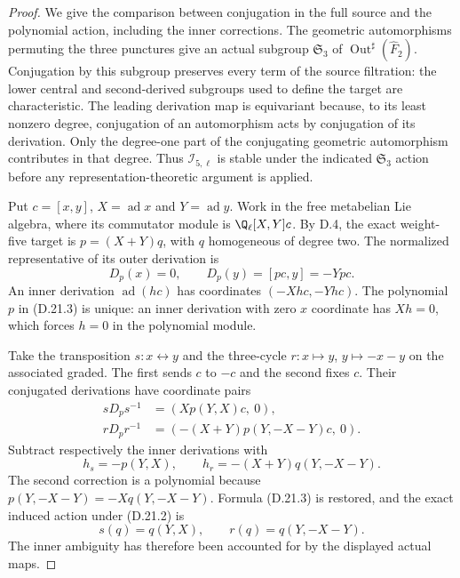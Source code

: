\begin{proof}
We give the comparison between conjugation in the full source
and the polynomial action, including the inner corrections.
The geometric automorphisms permuting the three punctures give
an actual subgroup $\mathfrak S_3$ of
$\operatorname{Out}^{\sharp}(\widehat F_2)$. Conjugation by
this subgroup preserves every term of the source filtration:
the lower central and second-derived subgroups used to define
the target are characteristic. The leading derivation map is
equivariant because, to its least nonzero degree, conjugation
of an automorphism acts by conjugation of its derivation.
Only the degree-one part of the conjugating geometric
automorphism contributes in that degree. Thus
$\mathscr I_{5,\ell}$ is stable under the indicated
$\mathfrak S_3$ action before any representation-theoretic
argument is applied.

Put $c=[x,y]$, $X=\operatorname{ad}x$ and
$Y=\operatorname{ad}y$. Work in the free metabelian Lie
algebra, where its commutator module is
$\Q_\ell[X,Y]c$. By D.4, the exact weight-five target is
$p=(X+Y)q$, with $q$ homogeneous of degree two.
The normalized representative of its outer derivation is
\[
        D_p(x)=0,\qquad D_p(y)=[pc,y]=-Ypc.
        \tag{D.21.3}
\]
An inner derivation $\operatorname{ad}(hc)$ has coordinates
$(-Xhc,-Yhc)$. The polynomial $p$ in (D.21.3) is unique:
an inner derivation with zero $x$ coordinate has $Xh=0$,
which forces $h=0$ in the polynomial module.

Take the transposition $s:x\leftrightarrow y$ and the
three-cycle $r:x\mapsto y$, $y\mapsto-x-y$ on the
associated graded. The first sends $c$ to $-c$ and the
second fixes $c$. Their conjugated derivations have
coordinate pairs
\[
 \begin{split}
 sD_ps^{-1}&=(X p(Y,X)c,\ 0),\\
 rD_pr^{-1}&=(-(X+Y)p(Y,-X-Y)c,\ 0).
 \end{split}                                               \tag{D.21.4}
\]
Subtract respectively the inner derivations with
\[
 h_s=-p(Y,X),\qquad
 h_r=-(X+Y)q(Y,-X-Y).
\]
The second correction is a polynomial because
$p(Y,-X-Y)=-Xq(Y,-X-Y)$. Formula (D.21.3) is restored,
and the exact induced action under (D.21.2) is
\[
              s(q)=q(Y,X),\qquad r(q)=q(Y,-X-Y).
              \tag{D.21.5}
\]
The inner ambiguity has therefore been accounted for by
the displayed actual maps.


\end{proof}

